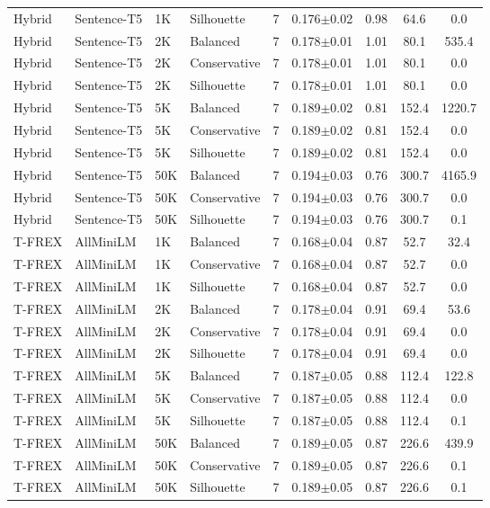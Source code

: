 \begin{table*}[htbp]
\begin{tabular}{|l|l|l|l|c|c|c|c|c|}
Hybrid & Sentence-T5 & 1K & Silhouette & 7 & 0.176$\pm$0.02 & 0.98 & 64.6 & 0.0 \\
Hybrid & Sentence-T5 & 2K & Balanced & 7 & 0.178$\pm$0.01 & 1.01 & 80.1 & 535.4 \\
Hybrid & Sentence-T5 & 2K & Conservative & 7 & 0.178$\pm$0.01 & 1.01 & 80.1 & 0.0 \\
Hybrid & Sentence-T5 & 2K & Silhouette & 7 & 0.178$\pm$0.01 & 1.01 & 80.1 & 0.0 \\
Hybrid & Sentence-T5 & 5K & Balanced & 7 & 0.189$\pm$0.02 & 0.81 & 152.4 & 1220.7 \\
Hybrid & Sentence-T5 & 5K & Conservative & 7 & 0.189$\pm$0.02 & 0.81 & 152.4 & 0.0 \\
Hybrid & Sentence-T5 & 5K & Silhouette & 7 & 0.189$\pm$0.02 & 0.81 & 152.4 & 0.0 \\
Hybrid & Sentence-T5 & 50K & Balanced & 7 & 0.194$\pm$0.03 & 0.76 & 300.7 & 4165.9 \\
Hybrid & Sentence-T5 & 50K & Conservative & 7 & 0.194$\pm$0.03 & 0.76 & 300.7 & 0.0 \\
Hybrid & Sentence-T5 & 50K & Silhouette & 7 & 0.194$\pm$0.03 & 0.76 & 300.7 & 0.1 \\
\hline
T-FREX & AllMiniLM & 1K & Balanced & 7 & 0.168$\pm$0.04 & 0.87 & 52.7 & 32.4 \\
T-FREX & AllMiniLM & 1K & Conservative & 7 & 0.168$\pm$0.04 & 0.87 & 52.7 & 0.0 \\
T-FREX & AllMiniLM & 1K & Silhouette & 7 & 0.168$\pm$0.04 & 0.87 & 52.7 & 0.0 \\
T-FREX & AllMiniLM & 2K & Balanced & 7 & 0.178$\pm$0.04 & 0.91 & 69.4 & 53.6 \\
T-FREX & AllMiniLM & 2K & Conservative & 7 & 0.178$\pm$0.04 & 0.91 & 69.4 & 0.0 \\
T-FREX & AllMiniLM & 2K & Silhouette & 7 & 0.178$\pm$0.04 & 0.91 & 69.4 & 0.0 \\
T-FREX & AllMiniLM & 5K & Balanced & 7 & 0.187$\pm$0.05 & 0.88 & 112.4 & 122.8 \\
T-FREX & AllMiniLM & 5K & Conservative & 7 & 0.187$\pm$0.05 & 0.88 & 112.4 & 0.0 \\
T-FREX & AllMiniLM & 5K & Silhouette & 7 & 0.187$\pm$0.05 & 0.88 & 112.4 & 0.1 \\
T-FREX & AllMiniLM & 50K & Balanced & 7 & 0.189$\pm$0.05 & 0.87 & 226.6 & 439.9 \\
T-FREX & AllMiniLM & 50K & Conservative & 7 & 0.189$\pm$0.05 & 0.87 & 226.6 & 0.1 \\
T-FREX & AllMiniLM & 50K & Silhouette & 7 & 0.189$\pm$0.05 & 0.87 & 226.6 & 0.1 \\

\end{tabular}
\end{table*}
